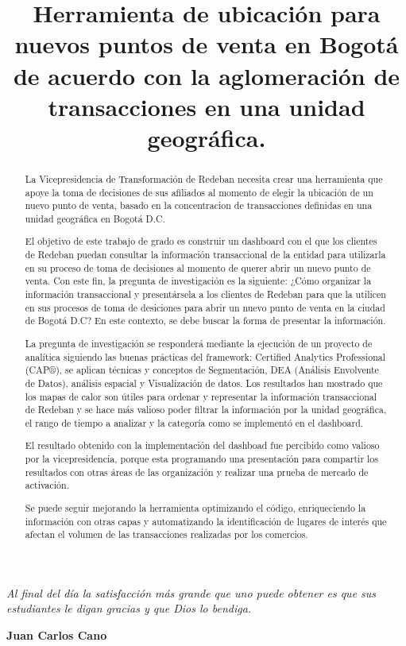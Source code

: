 \documentclass[a4paper]{article}
\begin{document}
\begin{flushright}
	\textit{Al final del día la satisfacción más grande que uno puede obtener es que sus estudiantes le digan gracias y que Dios lo bendiga.}\\
\end{flushright}

\begin{flushright}
	\textbf{Juan Carlos Cano}
\end{flushright}

\newpage

\title{Herramienta de ubicación para nuevos puntos de venta en Bogotá de acuerdo con la aglomeración de transacciones en una unidad geográfica.}

\maketitle

\begin{abstract}
	La Vicepresidencia de Transformación de Redeban necesita crear una herramienta que apoye la toma de decisiones de sus afiliados al momento de elegir la ubicación de un nuevo punto de venta, basado en la concentracion de transacciones definidas en una unidad geográfica en Bogotá D.C.

	El objetivo de este trabajo de grado es construir un dashboard con el que los clientes de Redeban puedan consultar la información transaccional de la entidad para utilizarla en su proceso de toma de decisiones al momento de querer abrir un nuevo punto de venta. Con este fin, la pregunta de investigación es la siguiente: ¿Cómo organizar la información transaccional y presentársela a los clientes de Redeban para que la utilicen en sus procesos de toma de desiciones para abrir un nuevo punto de venta en la ciudad de Bogotá D.C? En este contexto, se debe buscar la forma de presentar la información.

	La pregunta de investigación se responderá mediante la ejecución de un proyecto de analítica siguiendo las buenas prácticas del framework: Certified Analytics Professional (CAP®), se aplican técnicas y conceptos de Segmentación, DEA (Análisis Envolvente de Datos), análisis espacial y Visualización de datos. Los resultados han mostrado que los mapas de calor son útiles para ordenar y representar la información transaccional de Redeban y se hace más valioso poder filtrar la información por la unidad geográfica, el rango de tiempo a analizar y la categoría como se implementó en el dashboard. 

	El resultado obtenido con la implementación del dashboad fue percibido como valioso por la vicepresidencia, porque esta programando una presentación para compartir los resultados con otras áreas de las organización y realizar una prueba de mercado de activación.

	Se puede seguir mejorando la herramienta optimizando el código, enriqueciendo la información con otras capas y automatizando la identificación de lugares de interés que afectan el volumen de las transacciones realizadas por los comercios.

\end{abstract}
\end{document}
